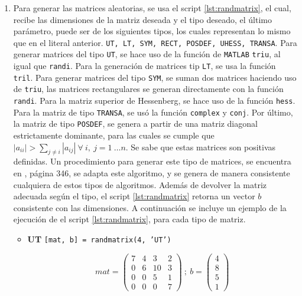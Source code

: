 \documentclass[11pt, spanish]{article}
\begin{document}
\begin{enumerate}
\begin{itemize}
\end{itemize}


\item Para generar las matrices aleatorias, se usa el script \ref{lst:randmatrix}, el cual, recibe las dimensiones de la matriz deseada y el tipo deseado, el último parámetro, puede ser de los siguientes tipos, los cuales representan lo mismo que en el literal anterior. \texttt{UT, LT, SYM, RECT, POSDEF, UHESS, TRANSA}. Para generar matrices del tipo \texttt{UT}, se hace uso de la función de \texttt{MATLAB} \texttt{triu}, al igual que \texttt{randi}. Para la generación de matrices tip \texttt{LT}, se usa la función \texttt{tril}. Para generar matrices del tipo \texttt{SYM}, se suman dos matrices haciendo uso de \texttt{triu}, las matrices rectangulares se generan directamente con la función \texttt{randi}. Para la matriz superior de Hessenberg, se hace uso de la función \texttt{hess}.\\

 Para la matriz de tipo \texttt{TRANSA}, se usó la función \texttt{complex} y \texttt{conj}. Por último, la matriz de tipo \texttt{POSDEF}, se genera a partir de una matriz diagonal estrictamente dominante, para las cuales se cumple que $|a_{ii}| > \sum_{j \neq i} |a_{ij}|\ \forall\ i,\ j = 1\ \dots n $. Se sabe que estas matrices son positivas definidas. Un procedimiento para generar este tipo de matrices, se encuentra en \cite{greenbaum2012numerical}, página 346, se adapta este algoritmo, y se genera de manera consistente cualquiera de estos tipos de algoritmos. Además de devolver la matriz adecuada según el tipo, el script \ref{lst:randmatrix} retorna un vector $b$ consistente con las dimensiones. A continuación se incluye un ejemplo de la ejecución de el script \ref{lst:randmatrix}, para cada tipo de matriz.

\begin{itemize}
\item \textbf{UT} \texttt{[mat, b] = randmatrix(4, 'UT')}

$$mat = \left(\begin{array}{cccc} 7 & 4 & 3 & 2\\ 0 & 6 & 10 & 3\\ 0 & 0 & 5 & 1\\ 0 & 0 & 0 & 7 \end{array}\right)\ ;\ b = \left(\begin{array}{c} 4\\ 8\\ 5\\ 1 \end{array}\right)$$\\


\end{itemize}
\end{enumerate}
\end{document}
